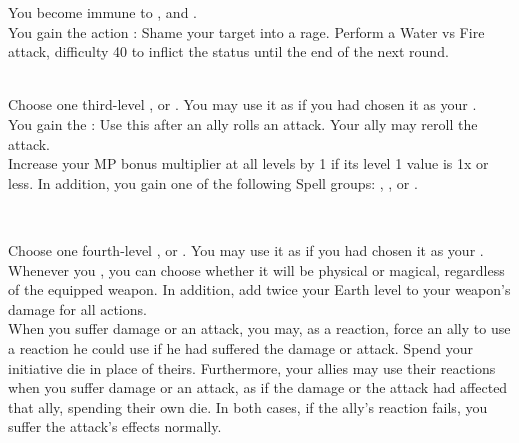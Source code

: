 \begin{tabjob}
         You become immune to ,  and . \\

         You gain the  action : Shame your target into a rage. Perform a Water vs Fire attack, difficulty 40 to inflict the  status until the end of the next round. \\
    
    \tabjobsep%
    
     \\
    \tabjobspec{}
         Choose one third-level ,  or . You may use it as if you had chosen it as your . \\
        
         You gain the  : Use this  after an ally rolls an attack. Your ally may reroll the attack. \\

         Increase your MP bonus multiplier at all levels by 1 if its level 1 value is 1x or less. In addition, you gain one of the following Spell groups: , ,  or . \\

    \tabjobsep%

     \\
    \tabjobspec{}

         Choose one fourth-level ,  or . You may use it as if you had chosen it as your . \\

         Whenever you , you can choose whether it will be physical or magical, regardless of the equipped weapon. In addition, add twice your Earth level to your weapon's damage for all actions. \\

         When you suffer damage or an attack, you may, as a reaction, force an ally to use a reaction he could use if he had suffered the damage or attack. Spend your initiative die in place of theirs. Furthermore, your allies may use their reactions when you suffer damage or an attack, as if the damage or the attack had affected that ally, spending their own die. In both cases, if the ally's reaction fails, you suffer the attack's effects normally. \\

\end{tabjob}